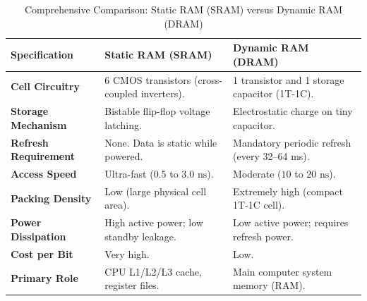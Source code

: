 \begin{table}[htbp]
\centering
\small
\caption{Comprehensive Comparison: Static RAM (SRAM) versus Dynamic RAM (DRAM)}
\label{tab:sram_vs_dram}
\begin{tabularx}{\textwidth}{l X X}
\toprule
\textbf{Specification} & \textbf{Static RAM (SRAM)} & \textbf{Dynamic RAM (DRAM)} \\
\midrule
\textbf{Cell Circuitry} & 6 CMOS transistors (cross-coupled inverters). & 1 transistor and 1 storage capacitor (1T-1C). \\
\textbf{Storage Mechanism} & Bistable flip-flop voltage latching. & Electrostatic charge on tiny capacitor. \\
\textbf{Refresh Requirement} & None. Data is static while powered. & Mandatory periodic refresh (every 32--64 ms). \\
\textbf{Access Speed} & Ultra-fast ($0.5$ to $3.0\text{ ns}$). & Moderate ($10$ to $20\text{ ns}$). \\
\textbf{Packing Density} & Low (large physical cell area). & Extremely high (compact 1T-1C cell). \\
\textbf{Power Dissipation} & High active power; low standby leakage. & Low active power; requires refresh power. \\
\textbf{Cost per Bit} & Very high. & Low. \\
\textbf{Primary Role} & CPU L1/L2/L3 cache, register files. & Main computer system memory (RAM). \\
\bottomrule
\end{tabularx}
\end{table}

